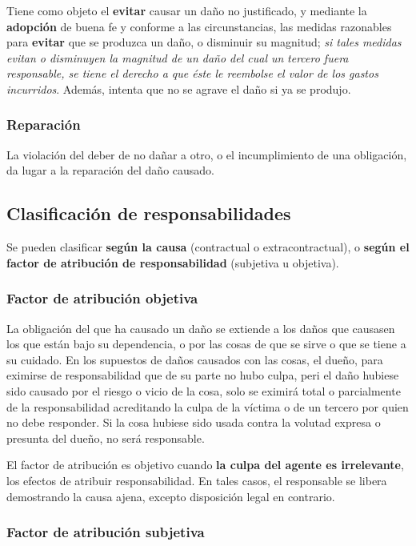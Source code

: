 \documentclass[../resumen.tex]{subfiles}
\begin{document}
Tiene como objeto el \textbf{evitar} causar un daño no justificado, y mediante 
la \textbf{adopción} de buena fe y conforme a las circunstancias, las medidas 
razonables para \textbf{evitar} que se produzca un daño, o disminuir su magnitud;
\textit{si tales medidas evitan o disminuyen la magnitud de un daño del cual un}
\textit{tercero fuera responsable, se tiene el derecho a que éste le reembolse}
\textit{el valor de los gastos incurridos}. Además, intenta que no se agrave el
daño si ya se produjo.

\subsubsection{Reparación}

La violación del deber de no dañar a otro, o el incumplimiento de una obligación,
da lugar a la reparación del daño causado.

\subsection{Clasificación de responsabilidades}

Se pueden clasificar \textbf{según la causa} (contractual o extracontractual),
o \textbf{según el factor de atribución de responsabilidad} (subjetiva u objetiva).

\subsubsection{Factor de atribución objetiva}

La obligación del que ha causado un daño se extiende a los daños que causasen
los que están bajo su dependencia, o por las cosas de que se sirve o que se tiene
a su cuidado. En los supuestos de daños causados con las cosas, el dueño, para
eximirse de responsabilidad que de su parte no hubo culpa, peri el daño hubiese
sido causado por el riesgo o vicio de la cosa, solo se eximirá total o parcialmente
de la responsabilidad acreditando la culpa de la víctima o de un tercero por
quien no debe responder. Si la cosa hubiese sido usada contra la volutad expresa
o presunta del dueño, no será responsable.

El factor de atribución es objetivo cuando \textbf{la culpa del agente es irrelevante},
los efectos de atribuir responsabilidad. En tales casos, el responsable se 
libera demostrando la causa ajena, excepto disposición legal en contrario.

\subsubsection{Factor de atribución subjetiva}
\end{document}
